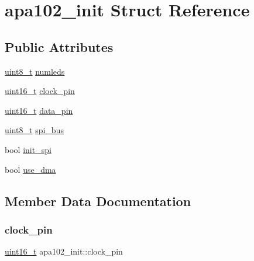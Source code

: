 \hypertarget{structapa102__init}{}\section{apa102\+\_\+init Struct Reference}
\label{structapa102__init}
\subsection*{Public Attributes}
\begin{DoxyCompactItemize}
\item 
\hyperlink{vl53l0x__types_8h_aba7bc1797add20fe3efdf37ced1182c5}{uint8\+\_\+t} \hyperlink{structapa102__init_a223a3c25189d56bf4defec98f1f0bba6}{numleds}
\item 
\hyperlink{vl53l0x__types_8h_a273cf69d639a59973b6019625df33e30}{uint16\+\_\+t} \hyperlink{structapa102__init_a8647a4e14b475e6a25c8588268b833ef}{clock\+\_\+pin}
\item 
\hyperlink{vl53l0x__types_8h_a273cf69d639a59973b6019625df33e30}{uint16\+\_\+t} \hyperlink{structapa102__init_aa938ca9d53d2a52df51cda832fea8db4}{data\+\_\+pin}
\item 
\hyperlink{vl53l0x__types_8h_aba7bc1797add20fe3efdf37ced1182c5}{uint8\+\_\+t} \hyperlink{structapa102__init_acce9148e955ab737c1caf45e755ed4ac}{spi\+\_\+bus}
\item 
bool \hyperlink{structapa102__init_ad361c33a36cb76c75374cf510b44bb49}{init\+\_\+spi}
\item 
bool \hyperlink{structapa102__init_a3e993d7cb6a0bab675e6a3ce46f87acb}{use\+\_\+dma}
\end{DoxyCompactItemize}


\subsection{Member Data Documentation}
\mbox{\label{structapa102__init_a8647a4e14b475e6a25c8588268b833ef}} 
\subsubsection{\texorpdfstring{clock\+\_\+pin}{clock\_pin}}
{\footnotesize\ttfamily \hyperlink{vl53l0x__types_8h_a273cf69d639a59973b6019625df33e30}{uint16\+\_\+t} apa102\+\_\+init\+::clock\+\_\+pin}


